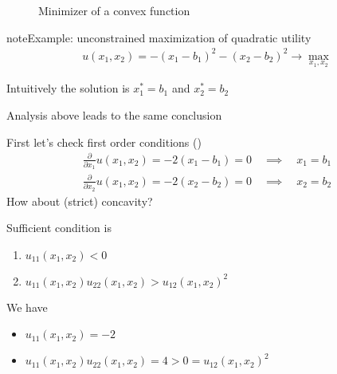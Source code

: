\documentclass[letterpaper,10pt,english]{jupyterBook}
\begin{document}
\begin{figure}[htbp]
\centering
\capstart

\noindent{}
\caption{Minimizer of a convex function}\label{\detokenize{02.optimization_intro:id18}}\end{figure}

\begin{sphinxadmonition}{note}{Example: unconstrained maximization of quadratic utility}
\begin{equation*}
\begin{split}
u(x_1, x_2) = - (x_1 - b_1)^2 - (x_2 - b_2)^2
\rightarrow \max_{x_1, x_2}
\end{split}
\end{equation*}\end{sphinxadmonition}

\sphinxAtStartPar
Intuitively the solution is \(x_1^*=b_1\) and \(x_2^*=b_2\)

\sphinxAtStartPar
Analysis above leads to the same conclusion

\sphinxAtStartPar
First let’s check first order conditions ()
\begin{equation*}
\begin{split}
\frac{\partial}{\partial x_1}
u(x_1, x_2) = -2 (x_1 - b_1) = 0
\quad \implies \quad
x_1 = b_1
\end{split}
\end{equation*}\begin{equation*}
\begin{split}
\frac{\partial}{\partial x_2}
u(x_1, x_2) = -2 (x_2 - b_2) = 0
\quad \implies \quad
x_2 = b_2
\end{split}
\end{equation*}
\sphinxAtStartPar
How about (strict) concavity?

\sphinxAtStartPar
Sufficient condition is
\begin{enumerate}
%
\item {} 
\sphinxAtStartPar
\(u_{11}(x_1, x_2) < 0\)

\item {} 
\sphinxAtStartPar
\(u_{11}(x_1, x_2)u_{22}(x_1, x_2) > u_{12}(x_1, x_2)^2\)

\end{enumerate}

\sphinxAtStartPar
We have
\begin{itemize}
\item {} 
\sphinxAtStartPar
\(u_{11}(x_1, x_2) = -2\)

\item {} 
\sphinxAtStartPar
\(u_{11}(x_1, x_2)u_{22}(x_1, x_2) = 4 > 0 = u_{12}(x_1, x_2)^2\)

\end{itemize}
\end{document}
